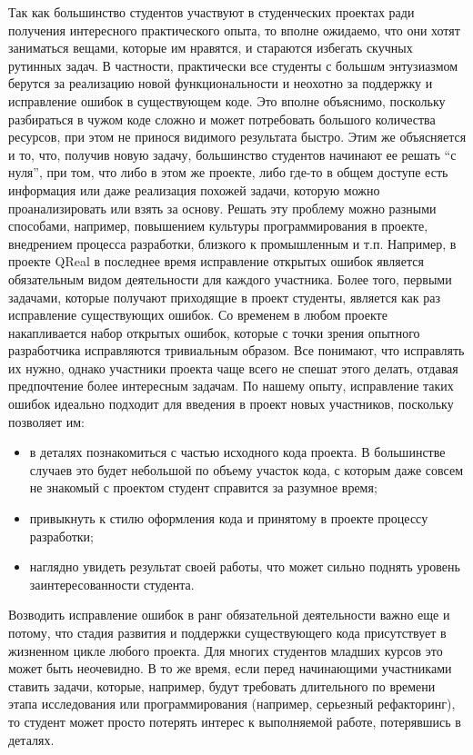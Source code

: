 \documentclass[a4paper]{article}
\begin{document}
Так как большинство студентов участвуют в студенческих проектах ради получения интересного практического опыта, то вполне ожидаемо, что они хотят заниматься вещами, которые им нравятся, и стараются избегать скучных рутинных задач. В частности, практически все студенты  с больш\textit{и}м энтузиазмом берутся за реализацию новой функциональности и неохотно за поддержку и исправление ошибок в существующем коде. Это вполне объяснимо, поскольку разбираться в чужом коде сложно и может потребовать большого количества ресурсов, при этом не принося видимого результата быстро. Этим же объясняется и то, что, получив новую задачу, большинство студентов начинают ее решать ``с нуля'', при том, что либо в этом же проекте, либо где-то в общем доступе есть информация или даже реализация похожей задачи, которую можно проанализировать или взять за основу. Решать эту проблему можно разными способами, например, повышением культуры программирования в проекте, внедрением процесса разработки, близкого к промышленным и т.п. Например, в проекте QReal в последнее время исправление открытых ошибок является обязательным видом деятельности для каждого участника. Более того, первыми задачами, которые получают приходящие в проект студенты, является как раз исправление существующих ошибок. Со временем в любом проекте накапливается набор открытых ошибок, которые с точки зрения опытного разработчика исправляются тривиальным образом. Все понимают, что исправлять их нужно, однако участники проекта чаще всего не спешат этого делать, отдавая предпочтение более интересным задачам. По нашему опыту, исправление таких ошибок идеально подходит для введения в проект новых участников, поскольку позволяет им:
\begin{itemize}
 \item в деталях познакомиться с частью исходного кода проекта. В большинстве случаев это будет небольшой по объему участок кода, с которым даже совсем не знакомый с проектом студент справится за разумное время;
 \item привыкнуть к стилю оформления кода и принятому в проекте процессу разработки;
 \item наглядно увидеть результат своей работы, что может сильно поднять уровень заинтересованности студента.
\end{itemize}
Возводить исправление ошибок в ранг обязательной деятельности важно еще и потому, что стадия развития и поддержки существующего кода присутствует в жизненном цикле любого проекта. Для многих студентов младших курсов это может быть неочевидно. В то же время, если перед начинающими участниками ставить задачи, которые, например, будут требовать длительного по времени этапа исследования или программирования (например, серьезный рефакторинг), то студент может просто потерять интерес к выполняемой работе, потерявшись в деталях.
\end{document}
